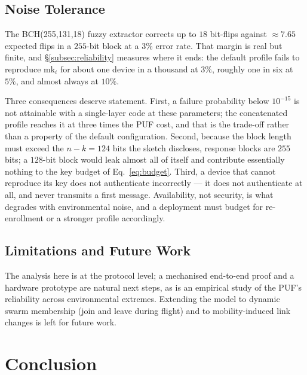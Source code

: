 \documentclass[11pt,a4paper]{article}
\begin{document}
\subsection{Noise Tolerance}
The BCH(255,131,18) fuzzy extractor corrects up to $18$ bit-flips against
$\approx 7.65$ expected flips in a $255$-bit block at a $3\%$ error rate. That
margin is real but finite, and \S\ref{subsec:reliability} measures where it ends:
the default profile fails to reproduce $\text{mk}_i$ for about one device in a
thousand at $3\%$, roughly one in six at $5\%$, and almost always at $10\%$.

Three consequences deserve statement. First, a failure probability below
$10^{-15}$ is not attainable with a single-layer code at these parameters; the
concatenated profile reaches it at three times the PUF cost, and that is the
trade-off rather than a property of the default configuration. Second, because the
block length must exceed the $n-k = 124$ bits the sketch discloses, response blocks
are $255$ bits; a $128$-bit block would leak almost all of itself and contribute
essentially nothing to the key budget of Eq.~\eqref{eq:budget}. Third, a device
that cannot reproduce its key does not authenticate incorrectly --- it does not
authenticate at all, and never transmits a first message. Availability, not
security, is what degrades with environmental noise, and a deployment must budget
for re-enrollment or a stronger profile accordingly.

\subsection{Limitations and Future Work}
The analysis here is at the protocol level; a mechanised end-to-end proof and a
hardware prototype are natural next steps, as is an empirical study of the PUF's
reliability across environmental extremes. Extending the model to dynamic swarm
membership (join and leave during flight) and to mobility-induced link changes
is left for future work.

\section{Conclusion}
\label{sec:conclusion}
\end{document}
